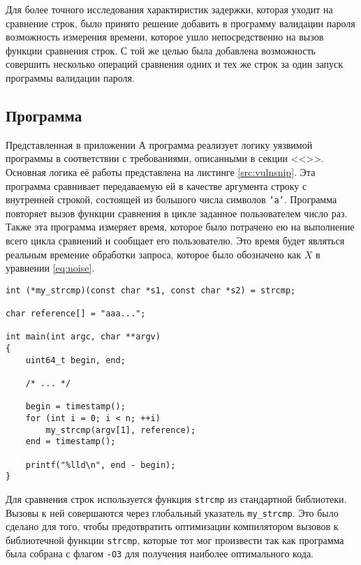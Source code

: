 Для более точного исследования характиристик задержки, которая уходит на
сравнение строк, было принято решение добавить в программу валидации пароля
возможность измерения времени, которое ушло непосредственно на вызов функции
сравнения строк. С той же целью была добавлена возможность совершить несколько
операций сравнения одних и тех же строк за один запуск программы валидации
пароля.

\subsection{Программа}

Представленная в приложении А программа  реализует логику
уязвимой программы в соответствии с требованиями, описанными в секции
<<>>. Основная логика её работы представлена на листинге
\ref{src:vulnsnip}. Эта программа сравнивает передаваемую ей в качестве
аргумента строку с внутренней строкой, состоящей из большого числа символов
\texttt{'a'}. Программа повторяет вызов функции сравнения в цикле заданное
пользователем число раз. Также эта программа измеряет время, которое было
потрачено ею на выполнение всего цикла сравнений и сообщает его пользователю.
Это время будет являться реальным времение обработки запроса, которое было
обозначено как $X$ в уравнении \ref{eq:noise}.

\nopagebreak

\begin{lstlisting}[caption=Фрагмент программы \texttt{vulnerable.c}, label=src:vulnsnip]
int (*my_strcmp)(const char *s1, const char *s2) = strcmp;

char reference[] = "aaa...";

int main(int argc, char **argv)
{
	uint64_t begin, end;

	/* ... */

	begin = timestamp();
	for (int i = 0; i < n; ++i)
		my_strcmp(argv[1], reference);
	end = timestamp();

	printf("%lld\n", end - begin);
}
\end{lstlisting}

Для сравнения строк используется функция \texttt{strcmp} из стандартной
библиотеки. Вызовы к ней совершаются через глобальный указатель
\texttt{my\_strcmp}. Это было сделано для того, чтобы предотвратить оптимизации
компилятором вызовов к библиотечной функции \texttt{strcmp}, которые тот мог
произвести так как программа была собрана с флагом \texttt{-O3} для получения
наиболее оптимального кода.

